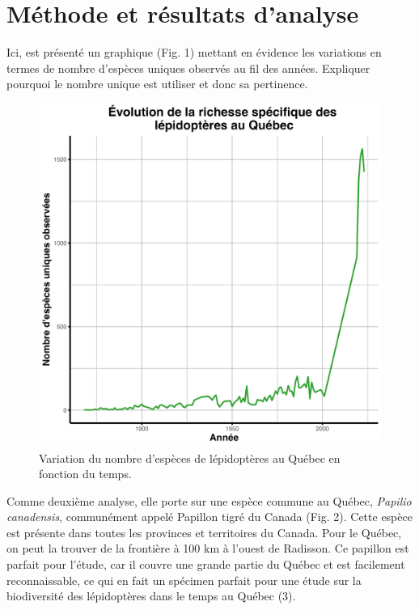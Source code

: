 \documentclass[9pt,twocolumn,twoside,]{pnas-new}
\begin{document}
\section{Méthode et résultats
d'analyse}\label{muxe9thode-et-ruxe9sultats-danalyse}

Ici, est présenté un graphique (Fig. 1) mettant en évidence les
variations en termes de nombre d'espèces uniques observés au fil des
années. Expliquer pourquoi le nombre unique est utiliser et donc sa
pertinence.

\begin{figure}
\includegraphics[width=0.9\linewidth]{../Figures_analyse/graphique_biodiversite} \caption{Variation du nombre d'espèces de lépidoptères au Québec en fonction du temps.}\label{fig:fig_graphique_biodiversite}
\end{figure}

Comme deuxième analyse, elle porte sur une espèce commune au Québec,
\emph{Papilio canadensis}, communément appelé Papillon tigré du Canada
(Fig. 2). Cette espèce est présente dans toutes les provinces et
territoires du Canada. Pour le Québec, on peut la trouver de la
frontière à 100 km à l'ouest de Radisson. Ce papillon est parfait pour
l'étude, car il couvre une grande partie du Québec et est facilement
reconnaissable, ce qui en fait un spécimen parfait pour une étude sur la
biodiversité des lépidoptères dans le temps au Québec (3).
\end{document}
